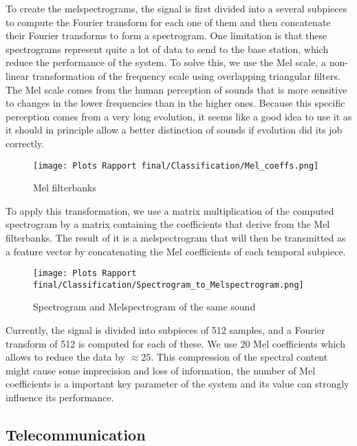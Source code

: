 \documentclass{article}
\begin{document}
To create the melspectrograms, the signal is first divided into a several subpieces to compute the Fourier transform for each one of them and then concatenate their Fourier transforms to form a spectrogram. One limitation is that these spectrograms represent quite a lot of data to send to the base station, which reduce the performance of the system. To solve this, we use the Mel scale, a non-linear transformation of the frequency scale using overlapping triangular filters. The Mel scale comes from the human perception of sounds that is more sensitive to changes in the lower frequencies than in the higher ones. Because this specific perception comes from a very long evolution, it seems like a good idea to use it as it should in principle allow a better distinction of sounds if evolution did its job correctly. 

\begin{figure}[h]
    \centering
    \texttt{[image: Plots Rapport final/Classification/Mel\_coeffs.png]}
    \caption{Mel filterbanks}
    \label{fig:enter-label}
\end{figure}

To apply this transformation, we use a matrix multiplication of the computed spectrogram by a matrix containing the coefficients that derive from the Mel filterbanks. The result of it is a melspectrogram that will then be transmitted as a feature vector by concatenating the Mel coefficients of each temporal subpiece.

\begin{figure}[h]
    \centering
    \texttt{[image: Plots Rapport final/Classification/Spectrogram\_to\_Melspectrogram.png]}
    \caption{Spectrogram and Melspectrogram of the same sound}
    \label{SpecAndMel}
\end{figure}

Currently, the signal is divided into subpieces of 512 samples, and a Fourier transform of 512 is computed for each of these. We use 20 Mel coefficients which allows to reduce the data by $\approx 25$. This compression of the spectral content might cause some imprecision and loss of information, the number of Mel coefficients is a important key parameter of the system and its value can strongly influence its performance.

\subsection{Telecommunication}
\end{document}
